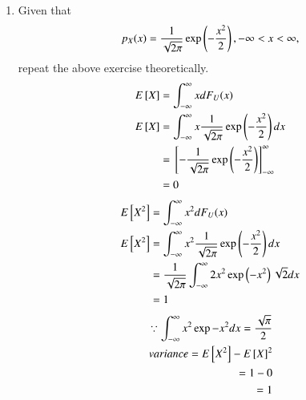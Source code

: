 \documentclass[journal,12pt,twocolumn]{IEEEtran}
\renewcommand\thesection{\arabic{section}}
\begin{document}
\begin{enumerate}[label=\thesection.\arabic*
,ref=\thesection.\theenumi]
\begin{lstlisting}
./out
\end{lstlisting}
\begin{lstlisting}
We get : Mean is 0.000685
        Variance is 1.000025
\end{lstlisting}
\item Given that 
\begin{align}
p_{X}(x) = \frac{1}{\sqrt{2\pi}}\exp\left(-\frac{x^2}{2}\right), -\infty < x < \infty,
\end{align}
repeat the above exercise theoretically.\\
\solution 
\begin{align}
E{}\left[X\right] & = \int_{-\infty}^{\infty}x dF_{U}(x)\\
E{}\left[X\right] & = \int_{-\infty}^{\infty}x \frac{1}{\sqrt{2\pi}}\exp\left(-\frac{x^2}{2}\right)dx\\ & = {}\left[-\frac{1}{\sqrt{2\pi}}\exp\left(-\frac{x^2}{2}\right)\right]_{-\infty}^{\infty}\\ & = 0
\end{align}
\begin{align}
E{}\left[X^2\right] & = \int_{-\infty}^{\infty}x^2 dF_{U}(x) \\
E{}\left[X^2\right] & = \int_{-\infty}^{\infty}x^2 \frac{1}{\sqrt{2\pi}}\exp\left(-\frac{x^2}{2}\right)dx\\& = \frac{1}{\sqrt{2\pi}} \int_{-\infty}^{\infty} 2x^2 \exp\left(-x^2\right) \sqrt{2}dx\\& = 1
\end{align}
\begin{align}
\because \int_{-\infty}^{\infty} x^2 \exp{-x^2}dx = \frac{\sqrt{\pi}}{2}\\
variance = E{}\left[X^2\right] - {E{}\left[X\right]}^2\\ = 1-0 \\ = 1
\end{align}
%
\end{enumerate}
\end{document}
